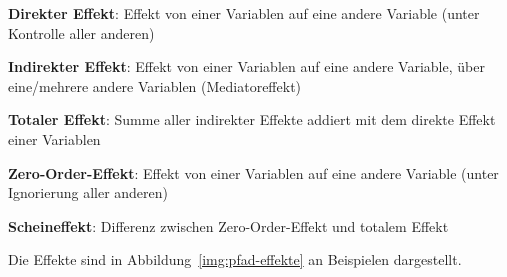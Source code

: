 \documentclass{article}
\numberwithin{equation}{section}
\begin{document}
\begin{compactitem}
\item \textbf{Direkter Effekt}: Effekt von einer Variablen auf eine andere Variable (unter Kontrolle aller anderen)
\item \textbf{Indirekter Effekt}: Effekt von einer Variablen auf eine andere Variable, über eine/mehrere andere Variablen (Mediatoreffekt)
\item \textbf{Totaler Effekt}: Summe aller indirekter Effekte addiert mit dem direkte Effekt einer Variablen
\item \textbf{Zero-Order-Effekt}: Effekt von einer Variablen auf eine andere Variable (unter Ignorierung aller anderen)
\item \textbf{Scheineffekt}: Differenz zwischen Zero-Order-Effekt und totalem Effekt
\end{compactitem}

Die Effekte sind in Abbildung~\ref{img:pfad-effekte} an Beispielen dargestellt.
\end{document}
